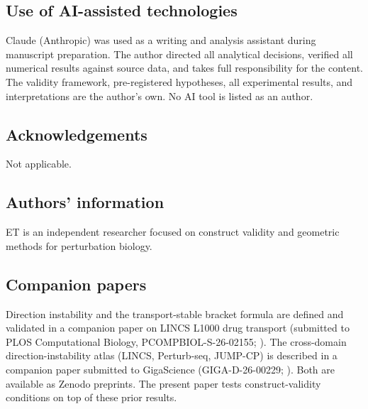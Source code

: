 \documentclass[11pt]{article}
\begin{document}
\subsection*{Use of AI-assisted technologies}
Claude (Anthropic) was used as a writing and analysis assistant during manuscript preparation. The author directed all analytical decisions, verified all numerical results against source data, and takes full responsibility for the content. The validity framework, pre-registered hypotheses, all experimental results, and interpretations are the author's own. No AI tool is listed as an author.

\subsection*{Acknowledgements}
Not applicable.

\subsection*{Authors' information}
ET is an independent researcher focused on construct validity
and geometric methods for perturbation biology.

\subsection*{Companion papers}
Direction instability and the transport-stable bracket formula are
defined and validated in a companion paper on LINCS L1000 drug
transport (submitted to PLOS Computational Biology,
PCOMPBIOL-S-26-02155; \citep{tower2026drug}). The cross-domain
direction-instability atlas (LINCS, Perturb-seq, JUMP-CP) is
described in a companion paper submitted to GigaScience
(GIGA-D-26-00229; \citep{tower2026atlas}). Both are available as
Zenodo preprints. The present paper tests construct-validity
conditions on top of these prior results.



\end{document}
